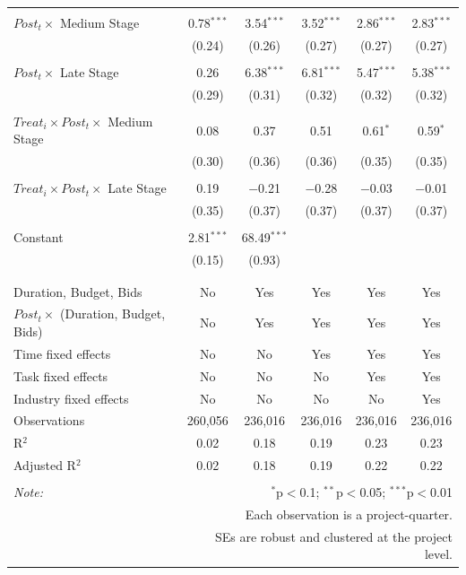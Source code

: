 \documentclass[
]{article}
\begin{document}
\begin{table}[H]
\begin{tabular}{@{\extracolsep{-2pt}}lccccc}
  & & & & & \\ 
 $Post_t \times$ Medium Stage & 0.78$^{***}$ & 3.54$^{***}$ & 3.52$^{***}$ & 2.86$^{***}$ & 2.83$^{***}$ \\ 
  & (0.24) & (0.26) & (0.27) & (0.27) & (0.27) \\ 
  & & & & & \\ 
 $Post_t \times$ Late Stage & 0.26 & 6.38$^{***}$ & 6.81$^{***}$ & 5.47$^{***}$ & 5.38$^{***}$ \\ 
  & (0.29) & (0.31) & (0.32) & (0.32) & (0.32) \\ 
  & & & & & \\ 
 $Treat_i \times Post_t \times$ Medium Stage & 0.08 & 0.37 & 0.51 & 0.61$^{*}$ & 0.59$^{*}$ \\ 
  & (0.30) & (0.36) & (0.36) & (0.35) & (0.35) \\ 
  & & & & & \\ 
 $Treat_i \times Post_t \times$ Late Stage & 0.19 & $-$0.21 & $-$0.28 & $-$0.03 & $-$0.01 \\ 
  & (0.35) & (0.37) & (0.37) & (0.37) & (0.37) \\ 
  & & & & & \\ 
 Constant & 2.81$^{***}$ & 68.49$^{***}$ &  &  &  \\ 
  & (0.15) & (0.93) &  &  &  \\ 
  & & & & & \\ 
\hline \\[-1.8ex] 
Duration, Budget, Bids & No & Yes & Yes & Yes & Yes \\ 
$Post_t \times $  (Duration, Budget, Bids) & No & Yes & Yes & Yes & Yes \\ 
Time fixed effects & No & No & Yes & Yes & Yes \\ 
Task fixed effects & No & No & No & Yes & Yes \\ 
Industry fixed effects & No & No & No & No & Yes \\ 
Observations & 260,056 & 236,016 & 236,016 & 236,016 & 236,016 \\ 
R$^{2}$ & 0.02 & 0.18 & 0.19 & 0.23 & 0.23 \\ 
Adjusted R$^{2}$ & 0.02 & 0.18 & 0.19 & 0.22 & 0.22 \\ 
\hline 
\hline \\[-1.8ex] 
\textit{Note:}  & \multicolumn{5}{r}{$^{*}$p$<$0.1; $^{**}$p$<$0.05; $^{***}$p$<$0.01} \\ 
 & \multicolumn{5}{r}{Each observation is a project-quarter.} \\ 
 & \multicolumn{5}{r}{SEs are robust and clustered at the project level.} \\ 
\end{tabular} 
\end{table}
\end{document}
